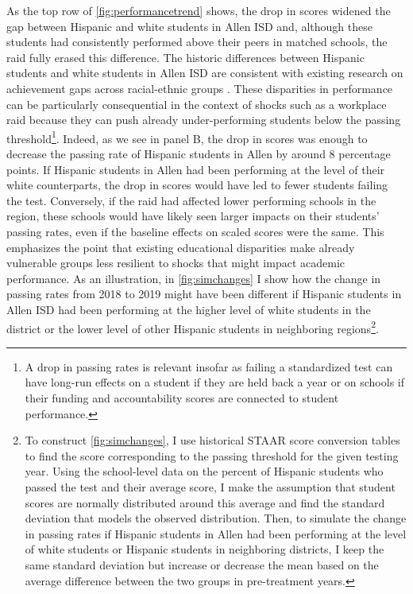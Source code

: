\documentclass[hidelinks,twoside]{article}
\begin{document}
As the top row of \autoref{fig:performancetrend} shows, the drop in scores widened the gap between Hispanic and white students in Allen ISD and, although these students had consistently performed above their peers in matched schools, the raid fully erased this difference. The historic differences between Hispanic students and white students in Allen ISD are consistent with existing research on achievement gaps across racial-ethnic groups \citep{reardon_2009_the,gandara_2010_the}. These disparities in performance can be particularly consequential in the context of shocks such as a workplace raid because they can push already under-performing students below the passing threshold\footnote{A drop in passing rates is relevant insofar as failing a standardized test can have long-run effects on a student if they are held back a year or on schools if their funding and accountability scores are connected to student performance.}. Indeed, as we see in panel B, the drop in scores was enough to decrease the passing rate of Hispanic students in Allen by around 8 percentage points. If Hispanic students in Allen had been performing at the level of their white counterparts, the drop in scores would have led to fewer students failing the test. Conversely, if the raid had affected lower performing schools in the region, these schools would have likely seen larger impacts on their students' passing rates, even if the baseline effects on scaled scores were the same. This emphasizes the point that existing educational disparities make already vulnerable groups less resilient to shocks that might impact academic performance. As an illustration, in \autoref{fig:simchanges} I show how the change in passing rates from 2018 to 2019 might have been different if Hispanic students in Allen ISD had been performing at the higher level of white students in the district or the lower level of other Hispanic students in neighboring regions\footnote{To construct \autoref{fig:simchanges}, I use historical STAAR score conversion tables to find the score corresponding to the passing threshold for the given testing year. Using the school-level data on the percent of Hispanic students who passed the test and their average score, I make the assumption that student scores are normally distributed around this average and find the standard deviation that models the observed distribution. Then, to simulate the change in passing rates if Hispanic students in Allen had been performing at the level of white students or Hispanic students in neighboring districts, I keep the same standard deviation but increase or decrease the mean based on the average difference between the two groups in pre-treatment years.}. 
\end{document}
